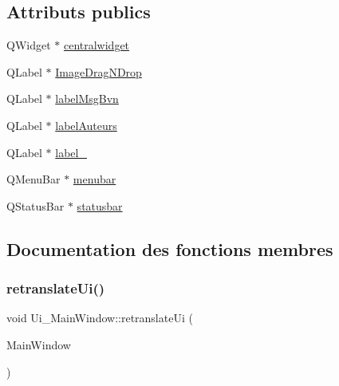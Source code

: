 \subsection*{Attributs publics}
\begin{DoxyCompactItemize}
\item 
Q\+Widget $\ast$ \hyperlink{class_ui___main_window_a356f1cf3ebda15f1fac59467ee081b74}{centralwidget}
\item 
Q\+Label $\ast$ \hyperlink{class_ui___main_window_ab0067ac42360f3cf2bb414b788d22f8e}{Image\+Drag\+N\+Drop}
\item 
Q\+Label $\ast$ \hyperlink{class_ui___main_window_a06205a0a8713b97da37a408c9dd3058e}{label\+Msg\+Bvn}
\item 
Q\+Label $\ast$ \hyperlink{class_ui___main_window_ae3a2caa0dbf4539a0bd06f4e35ddc537}{label\+Auteurs}
\item 
Q\+Label $\ast$ \hyperlink{class_ui___main_window_a2e2516d755e4dd53fc905dabddf2738a}{label\+\_}
\item 
Q\+Menu\+Bar $\ast$ \hyperlink{class_ui___main_window_adf43d9a67adaec750aaa956b5e082f09}{menubar}
\item 
Q\+Status\+Bar $\ast$ \hyperlink{class_ui___main_window_a1687cceb1e2787aa1f83e50433943a91}{statusbar}
\end{DoxyCompactItemize}


\subsection{Documentation des fonctions membres}
\mbox{\label{class_ui___main_window_a097dd160c3534a204904cb374412c618}} 
\subsubsection{\texorpdfstring{retranslate\+Ui()}{retranslateUi()}}
{\footnotesize\ttfamily void Ui\+\_\+\+Main\+Window\+::retranslate\+Ui (\begin{DoxyParamCaption}\item[{Q\+Main\+Window $\ast$}]{Main\+Window }\end{DoxyParamCaption})\hspace{0.3cm}{\ttfamily [inline]}}

\mbox{\label{class_ui___main_window_acf4a0872c4c77d8f43a2ec66ed849b58}} 
